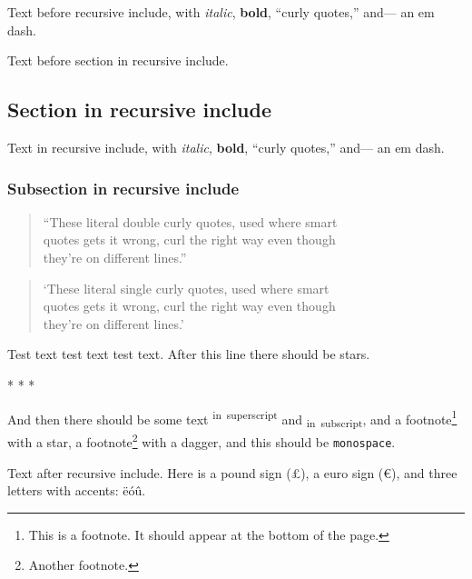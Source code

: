 \documentclass[
  12pt,
  a4paper,
]{article}
\begin{document}
Text before recursive include, with \emph{italic}, \textbf{bold},
``curly quotes,'' and--- an em dash.

Text before section in recursive include.

\hypertarget{__h2_6}{%
\subsection{Section in recursive include}\label{__h2_6}}

\makeatletter
\@afterindentfalse
\@afterheading
\makeatother

Text in recursive include, with \emph{italic}, \textbf{bold}, ``curly
quotes,'' and--- an em dash.

\hypertarget{__h3_3}{%
\subsubsection{Subsection in recursive include}\label{__h3_3}}

\begin{quote}
``These literal double curly quotes, used where smart\\
quotes gets it wrong, curl the right way even though\\
they're on different lines.''
\end{quote}

\begin{quote}
`These literal single curly quotes, used where smart\\
quotes gets it wrong, curl the right way even though\\
they're on different lines.'
\end{quote}

\makeatletter
\@afterindentfalse
\@afterheading
\makeatother

Test text test text test text. After this line there should be stars.

\begin{center}* * *\end{center}

\makeatletter
\@afterindentfalse
\@afterheading
\makeatother

And then there should be some text \textsuperscript{in~superscript} and
\textsubscript{in~subscript}, and a footnote\footnote{This is a
  footnote. It should appear at the bottom of the page.} with a star, a
footnote\footnote{Another footnote.} with a dagger, and this should be
\texttt{monospace}.

Text after recursive include. Here is a pound sign (£), a euro sign (€),
and three letters with accents: ëóû.
\end{document}
